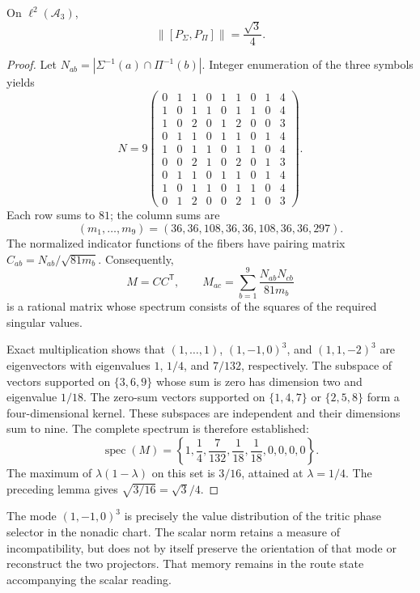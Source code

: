 \begin{proposition}
On \(\ell^2(\mathcal A_3)\),
\begin{equation}
 \|[P_\Sigma,P_\Pi]\|=\frac{\sqrt3}{4}.
 \label{x_reciprocidad:eq:el-prefactor}
\end{equation}
\end{proposition}
\begin{proof}
Let \(N_{ab}=|\Sigma^{-1}(a)\cap\Pi^{-1}(b)|\). Integer enumeration
of the three symbols yields
\[
 N=9\begin{pmatrix}
 0&1&1&0&1&1&0&1&4\\
 1&0&1&1&0&1&1&0&4\\
 1&0&2&0&1&2&0&0&3\\
 0&1&1&0&1&1&0&1&4\\
 1&0&1&1&0&1&1&0&4\\
 0&0&2&1&0&2&0&1&3\\
 0&1&1&0&1&1&0&1&4\\
 1&0&1&1&0&1&1&0&4\\
 0&1&2&0&0&2&1&0&3
 \end{pmatrix}.
\]
Each row sums to \(81\); the column sums are
\[
 (m_1,\ldots,m_9)=(36,36,108,36,36,108,36,36,297).
\]
The normalized indicator functions of the fibers have pairing
matrix \(C_{ab}=N_{ab}/\sqrt{81m_b}\). Consequently,
\[
 M=CC^{\mathsf T},\qquad
 M_{ac}=\sum_{b=1}^9\frac{N_{ab}N_{cb}}{81m_b}
\]
is a rational matrix whose spectrum consists of the squares of the
required singular values.

Exact multiplication shows that \((1,\ldots,1)\),
\((1,-1,0)^3\), and \((1,1,-2)^3\) are eigenvectors with eigenvalues
\(1\), \(1/4\), and \(7/132\), respectively. The subspace of
vectors supported on \(\{3,6,9\}\) whose sum is zero has dimension
two and eigenvalue \(1/18\). The zero-sum vectors supported on
\(\{1,4,7\}\) or \(\{2,5,8\}\) form a four-dimensional
kernel. These subspaces are independent and their dimensions sum to
nine. The complete spectrum is therefore established:
\[
 \operatorname{spec}(M)=
 \left\{1,\frac14,\frac7{132},\frac1{18},\frac1{18},0,0,0,0\right\}.
\]
The maximum of \(\lambda(1-\lambda)\) on this set is \(3/16\),
attained at \(\lambda=1/4\). The preceding lemma gives
\(\sqrt{3/16}=\sqrt3/4\).
\end{proof}

The mode \((1,-1,0)^3\) is precisely the value distribution of the
tritic phase selector in the nonadic chart. The scalar norm retains
a measure of incompatibility, but does not by itself preserve the
orientation of that mode or reconstruct the two projectors. That memory
remains in the route state accompanying the scalar reading.

